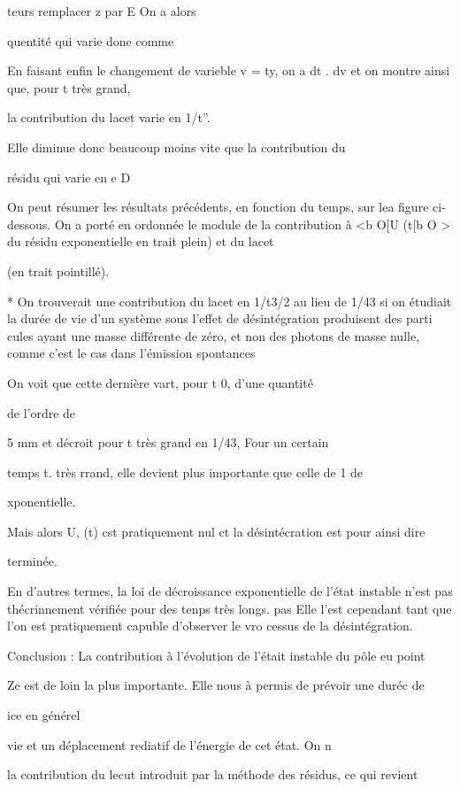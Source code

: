 teurs remplacer z par E On a alors

quentité qui varie done comme


En faisant enfin le changement de varieble v = ty, on a
 dt  .
 dv et on montre ainsi que, pour t très grand,

la contribution du lacet varie en 1/t”.

Elle diminue donc beaucoup moins vite que la contribution du

résidu qui varie en e D

On peut résumer les résultats précédents, en fonction du temps,
sur lea figure ci-dessous. On a porté en ordonnée le module de la contribution
à <b O[U (t[b O > du résidu exponentielle en trait plein) et du lacet

(en trait pointillé).


* On trouverait une contribution du lacet en 1/t3/2 au lieu de 1/43 si on étudiait
la durée de vie d'un système sous l'effet de désintégration produisent des parti
cules ayant une masse différente de zéro, et non des photons de masse nulle, comme
c'est le cas dans l'émission spontances

On voit que cette dernière vart, pour t  0, d'une quantité

de l'ordre de 

5 mm et décroit pour t très grand en 1/43, Four un certain

temps t. très rrand, elle devient plus importante que celle de 1
 de

xponentielle.

Mais alors U, (t) cst pratiquement nul ct la désintécration est pour ainsi dire

terminée.

En d'autres termes, la loi de décroissance exponentielle de
l'état instable n'est pas thécrinnement vérifiée pour des tenps très longs.
pas
Elle l'est cependant tant que l'on est pratiquement capuble d'observer le vro
cessus de la désintégration.

Conclusion : La contribution à l'évolution de l'était instable du pôle eu point

Ze est de loin la plus importante. Elle nous à permis de prévoir une duréc de

ice en générel

vie et un déplacement rediatif de l'énergie de cet état. On n

la contribution du lecut introduit par la méthode des résidus, ce qui revient

